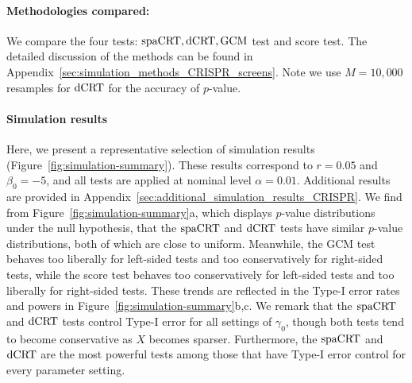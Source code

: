 \documentclass[12pt]{article}
\theoremstyle{definition}
\newcommand{\srx}{X}									%
\newcommand{\dCRT}{\textnormal{dCRT}} 					%
\newcommand{\GCM}{\textnormal{GCM}}						%
\newcommand{\spacrt}{\textnormal{spaCRT}}               %
\begin{document}
  
  \paragraph{Methodologies compared:}
  
  
  We compare the four tests: $\spacrt,\dCRT,\GCM$ test and score test. The detailed discussion of the methods can be found in Appendix~\ref{sec:simulation_methods_CRISPR_screens}. Note we use $M=10,000$ resamples for $\dCRT$ for the accuracy of $p$-value.
  
  
  
  \paragraph{Simulation results}
  
  Here, we present a representative selection of simulation results (Figure~\ref{fig:simulation-summary}). These results correspond to $r = 0.05$ and $\beta_0 = -5$, and all tests are applied at nominal level $\alpha = 0.01$. Additional results are provided in Appendix~\ref{sec:additional_simulation_results_CRISPR}. We find from Figure~\ref{fig:simulation-summary}a, which displays $p$-value distributions under the null hypothesis, that the $\spacrt$ and $\dCRT$ tests have similar $p$-value distributions, both of which are close to uniform. Meanwhile, the GCM test behaves too liberally for left-sided tests and too conservatively for right-sided tests, while the score test behaves too conservatively for left-sided tests and too liberally for right-sided tests. These trends are reflected in the Type-I error rates and powers in Figure~\ref{fig:simulation-summary}b,c. We remark that the $\spacrt$ and $\dCRT$ tests control Type-I error for all settings of $\gamma_0$, though both tests tend to become conservative as $\srx$ becomes sparser. Furthermore, the $\spacrt$ and $\dCRT$ are the most powerful tests among those that have Type-I error control for every parameter setting.
\end{document}
